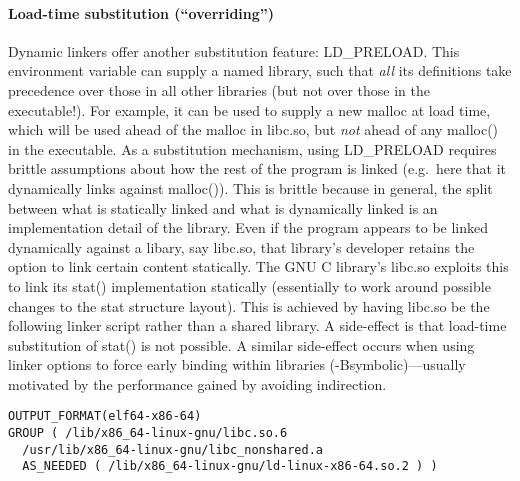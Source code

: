 \paragraph{Load-time substitution (``overriding'')}
Dynamic linkers offer another substitution feature: \textsf{LD\_PRELOAD}. 
This environment variable can supply a named library, such that
\emph{all} its definitions take precedence over those in all other
libraries (but not over those in the executable!). 
For example, it can be used to supply a new \textsf{malloc} at load time, which will be used ahead of the \textsf{malloc} in \textsf{libc.so}, but \emph{not} ahead of any \textsf{malloc()} in the executable.
As a substitution mechanism, using \textsf{LD\_PRELOAD} requires brittle assumptions about how the rest of the program is linked (e.g.\ here that it dynamically links against \textsf{malloc()}).
This is brittle because in general, the split between what is statically linked and what is dynamically linked is an implementation detail of the library. 
Even if the program appears to be linked dynamically against a libary, say \textsf{libc.so}, that library's developer retains the option to link certain content statically.
The GNU C library's \textsf{libc.so} exploits this to link its \textsf{stat()} implementation statically (essentially to work around possible changes to the \textsf{stat} structure layout).
This is achieved by having \textsf{libc.so} be the following linker script rather than a shared library.
A side-effect is that load-time substitution of \textsf{stat()} is not possible.
A similar side-effect occurs when using linker options to force early binding within libraries (\textsf{-Bsymbolic})---usually motivated by the performance gained by avoiding indirection. 

{\scriptsize\begin{lstlisting}[language=plain,basicstyle=\sffamily,columns=flexible]
OUTPUT_FORMAT(elf64-x86-64)
GROUP ( /lib/x86_64-linux-gnu/libc.so.6 
  /usr/lib/x86_64-linux-gnu/libc_nonshared.a
  AS_NEEDED ( /lib/x86_64-linux-gnu/ld-linux-x86-64.so.2 ) )
\end{lstlisting}}


